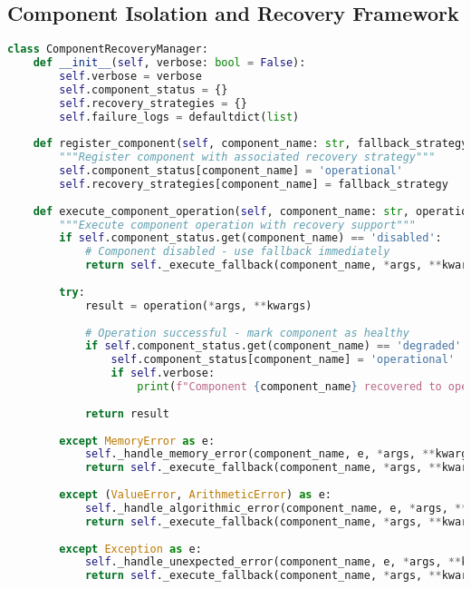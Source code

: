 \subsection{Component Isolation and Recovery Framework}
\label{appendix:component-recovery}

\begin{lstlisting}[language=Python, caption=Component Isolation and Recovery Framework]
class ComponentRecoveryManager:
    def __init__(self, verbose: bool = False):
        self.verbose = verbose
        self.component_status = {}
        self.recovery_strategies = {}
        self.failure_logs = defaultdict(list)
    
    def register_component(self, component_name: str, fallback_strategy: Callable):
        """Register component with associated recovery strategy"""
        self.component_status[component_name] = 'operational'
        self.recovery_strategies[component_name] = fallback_strategy
    
    def execute_component_operation(self, component_name: str, operation: Callable, *args, **kwargs):
        """Execute component operation with recovery support"""
        if self.component_status.get(component_name) == 'disabled':
            # Component disabled - use fallback immediately
            return self._execute_fallback(component_name, *args, **kwargs)
        
        try:
            result = operation(*args, **kwargs)
            
            # Operation successful - mark component as healthy
            if self.component_status.get(component_name) == 'degraded':
                self.component_status[component_name] = 'operational'
                if self.verbose:
                    print(f"Component {component_name} recovered to operational status")
            
            return result
            
        except MemoryError as e:
            self._handle_memory_error(component_name, e, *args, **kwargs)
            return self._execute_fallback(component_name, *args, **kwargs)
            
        except (ValueError, ArithmeticError) as e:
            self._handle_algorithmic_error(component_name, e, *args, **kwargs)
            return self._execute_fallback(component_name, *args, **kwargs)
            
        except Exception as e:
            self._handle_unexpected_error(component_name, e, *args, **kwargs)
            return self._execute_fallback(component_name, *args, **kwargs)
    

\end{lstlisting}
